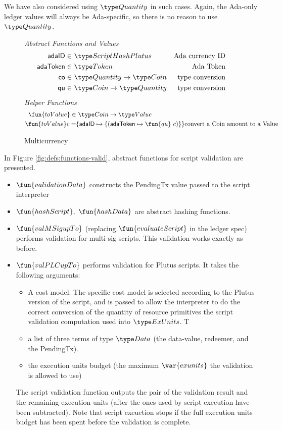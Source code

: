 We have also considered using $\Quantity$ in such cases. Again, the Ada-only
ledger values will always be Ada-specific, so there is no reason to use $\Quantity$.


\begin{figure*}[htb]
  \emph{Abstract Functions and Values}
  \begin{align*}
    \mathsf{adaID} \in& ~\ScriptHashPlutus
    & \text{Ada currency ID} \\
    \mathsf{adaToken} \in& ~\Token
    & \text{Ada Token} \\
    \mathsf{co} \in& ~\Quantity \to \Coin
    & \text{type conversion} \\
    \mathsf{qu} \in& ~\Coin \to \Quantity
    & \text{type conversion} \\
  \end{align*}
  \emph{Helper Functions}
  \begin{align*}
    \fun{toValue} \in & ~\Coin\to \Value \\
    \fun{toValue} c = & \{\mathsf{adaID} \mapsto \{(\mathsf{adaToken} \mapsto \fun{qu}~c)\}\}
    \text{convert a Coin amount to a Value} \\
  \end{align*}
  \caption{Multicurrency}
  \label{fig:defs:functions-helper}
\end{figure*}

In Figure \ref{fig:defs:functions-valid}, abstract functions for script validation
are presented.

\begin{itemize}
  \item $\fun{validationData}$ constructs the PendingTx value passed
  to the script interpreter
  \item $\fun{hashScript},~ \fun{hashData}$ are abstract hashing functions.
  \item $\fun{valMSigupTo}$ (replacing $\fun{evaluateScript}$ in the ledger spec) performs
  validation for multi-sig scripts.
  This validation works exactly as before.
  \item $\fun{valPLCupTo}$ performs validation for Plutus scripts. It takes the following
  arguments:
  \begin{itemize}
  \item A cost model. The specific cost model is selected according to the Plutus
  version of the script, and is passed to allow the interpreter to do the
  correct conversion of the quantity of resource primitives the script validation
  computation used into $\ExUnits$. T
  \item
  a list of three terms of type $\Data$ (the data-value, redeemer,
  and the PendingTx).
  \item the execution units budget (the maximum $\var{exunits}$
  the validation is allowed to use)
  \end{itemize}
  The script validation function outputs the pair of the validation result
  and the remaining execution units (after the ones used by script execution
  have been subtracted). Note that script exeuction stops if the full execution
  units budget has been spent before the validation is complete.
\end{itemize}


